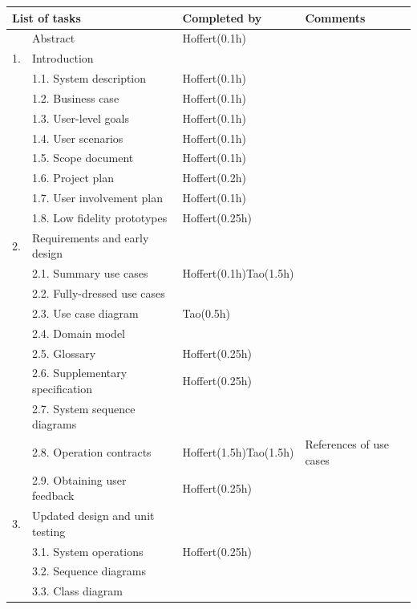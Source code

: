 \documentclass[12pt,a4paper]{article}
\begin{document}
\begin{longtable}{| p{0.2cm} p{6.25cm} | p{3cm}| p{5cm} |}
  \hline
  \multicolumn{2}{|l|}{\textbf{List of tasks}} & \textbf{Completed by} & \textbf{Comments} \\ \hline
   & Abstract & Hoffert(0.1h) &  \\ \hline
  1. & Introduction &  &  \\ \hline
   & 1.1. System description & Hoffert(0.1h) &  \\ \hline
   & 1.2. Business case & Hoffert(0.1h) &  \\ \hline
   & 1.3. User-level goals & Hoffert(0.1h) &  \\ \hline
   & 1.4. User scenarios & Hoffert(0.1h) &  \\ \hline
   & 1.5. Scope document & Hoffert(0.1h) &  \\ \hline
   & 1.6. Project plan & Hoffert(0.2h) &  \\ \hline
   & 1.7. User involvement plan & Hoffert(0.1h) &  \\ \hline
   & 1.8. Low fidelity prototypes & Hoffert(0.25h) &  \\ \hline
  2. & Requirements and early design &  &  \\ \hline
   & 2.1. Summary use cases & Hoffert(0.1h)\newline Tao(1.5h) &  \\ \hline
   & 2.2. Fully-dressed use cases &  &  \\ \hline
   & 2.3. Use case diagram & Tao(0.5h) &  \\ \hline
   & 2.4. Domain model &  &  \\ \hline
   & 2.5. Glossary & Hoffert(0.25h) &  \\ \hline
   & 2.6. Supplementary specification & Hoffert(0.25h) &  \\ \hline
   & 2.7. System sequence diagrams &  &  \\ \hline
   & 2.8. Operation contracts & Hoffert(1.5h)\newline Tao(1.5h) & \newline References of use cases  \\ \hline
   & 2.9. Obtaining user feedback & Hoffert(0.25h) &  \\ \hline
  3. & Updated design and unit testing &  &  \\ \hline
   & 3.1. System operations & Hoffert(0.25h) &  \\ \hline
   & 3.2. Sequence diagrams &  &  \\ \hline
   & 3.3. Class diagram &  &  \\ \hline

\end{longtable}
\end{document}
